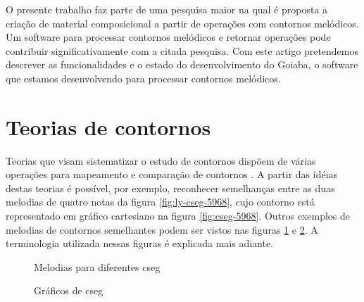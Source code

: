 
O presente trabalho faz parte de uma pesquisa maior na qual é proposta
a criação de material composicional a partir de operações com
contornos melódicos. Um software para processar contornos melódicos e
retornar operações pode contribuir significativamente com a citada
pesquisa. Com este artigo pretendemos descrever as funcionalidades e o
estado do desenvolvimento do Goiaba, o software que estamos
desenvolvendo para processar contornos melódicos.

\section{Teorias de contornos}
\label{sec:teorias-de-contornos}

Teorias que visam sistematizar o estudo de contornos dispõem de várias
operações para mapeamento e comparação de contornos
\cite{friedmann85:methodology,friedmann87:response,morris87:composition,morris93:directions,marvin.ea87:relating,clifford95:contour,polansky.ea92:possible,quinn97:fuzzy,beard03:contour}. A
partir das idéias destas teorias é possível, por exemplo, reconhecer
semelhanças entre as duas melodias de quatro notas da figura
\ref{fig:ly-cseg-5968}, cujo contorno está representado em gráfico
cartesiano na figura \ref{fig:cseg-5968}. Outros exemplos de melodias
de contornos semelhantes podem ser vistos nas figuras
\ref{fig:melodias-cseg} e \ref{fig:graficos-cseg}. A terminologia
utilizada nessas figuras é explicada mais adiante.

\begin{figure}
  \centering
  \caption{Melodias para diferentes cseg}
  \label{fig:melodias-cseg}
\end{figure}

\begin{figure}
  \centering
  \caption{Gráficos de cseg}
  \label{fig:graficos-cseg}
\end{figure}

